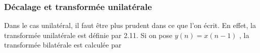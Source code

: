 \subsubsection{D\'{e}calage et transform\'{e}e unilat\'{e}rale}
Dans le cas unilat\'{e}ral, il faut \^{e}tre plus prudent dans ce que l'on \'{e}crit. En effet, la transform\'{e}e unilat\'{e}rale est d\'{e}finie par 2.11. Si on pose $y(n)=x(n-1)$ , la transform\'{e}e bilat\'{e}rale est calcul\'{e}e par
%
%
%
%
%
%
%
%
%
%
%
%
